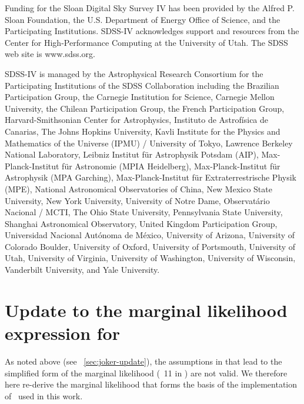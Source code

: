 \documentclass[modern]{aastex63}
\begin{document}
Funding for the Sloan Digital Sky Survey IV has been provided by the Alfred P.
Sloan Foundation, the U.S. Department of Energy Office of Science, and the
Participating Institutions. SDSS-IV acknowledges support and resources from the
Center for High-Performance Computing at the University of Utah. The SDSS web
site is www.sdss.org.

SDSS-IV is managed by the Astrophysical Research Consortium for the
Participating Institutions of the SDSS Collaboration including the Brazilian
Participation Group, the Carnegie Institution for Science, Carnegie Mellon
University, the Chilean Participation Group, the French Participation Group,
Harvard-Smithsonian Center for Astrophysics, Instituto de Astrof\'isica de
Canarias, The Johns Hopkins University, Kavli Institute for the Physics and
Mathematics of the Universe (IPMU) / University of Tokyo, Lawrence Berkeley
National Laboratory, Leibniz Institut f\"ur Astrophysik Potsdam (AIP),
Max-Planck-Institut f\"ur Astronomie (MPIA Heidelberg), Max-Planck-Institut
f\"ur Astrophysik (MPA Garching), Max-Planck-Institut f\"ur Extraterrestrische
Physik (MPE), National Astronomical Observatories of China, New Mexico State
University, New York University, University of Notre Dame, Observat\'ario
Nacional / MCTI, The Ohio State University, Pennsylvania State University,
Shanghai Astronomical Observatory, United Kingdom Participation Group,
Universidad Nacional Aut\'onoma de M\'exico, University of Arizona, University
of Colorado Boulder, University of Oxford, University of Portsmouth, University
of Utah, University of Virginia, University of Washington, University of
Wisconsin, Vanderbilt University, and Yale University.




\appendix

\section{Update to the marginal likelihood expression for \thejoker}
\label{app:marginal-likelihood}

As noted above (see \sectionname~\ref{sec:joker-update}), the assumptions in
\cite{thejoker} that lead to the simplified form of the marginal likelihood
(\equationname~11 in \citealt{thejoker}) are not valid.
We therefore here re-derive the marginal likelihood that forms the basis of the
implementation of \thejoker\ used in this work.
\end{document}
